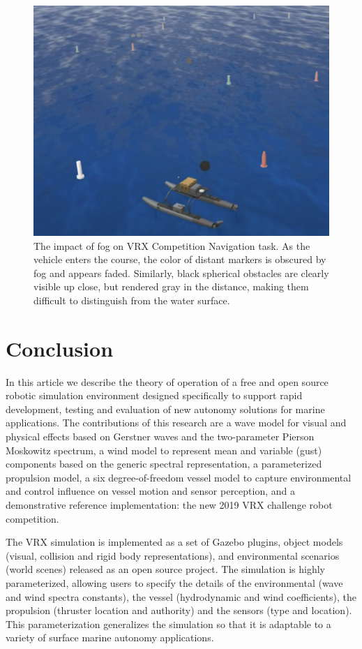 \documentclass[utf8]{frontiersSCNS} %
\begin{document}
\begin{figure}[hbt!]
  \centering
  \includegraphics[width=\FigWidth\textwidth]{images/navigation_wide_fog_2.png}
  \caption{The impact of fog on VRX Competition Navigation task. As the vehicle enters the course, the color of distant markers is obscured by fog and appears faded. Similarly, black spherical obstacles are clearly visible up close, but rendered gray in the distance, making them difficult to distinguish from the water surface. }
  \label{f:navigation_fog}
\end{figure}

\section{Conclusion}

In this article we describe the theory of operation of a free and open source robotic simulation environment designed specifically to support rapid development, testing and evaluation of new autonomy solutions for marine applications. The contributions of this research are a wave model for visual and physical effects based on Gerstner waves and the two-parameter Pierson Moskowitz spectrum, a wind model to represent mean and variable (gust) components based on the generic spectral representation, a parameterized propulsion model, a six degree-of-freedom vessel model to capture environmental and control influence on vessel motion and sensor perception, and a demonstrative reference implementation: the new 2019 VRX challenge robot competition.

The VRX simulation is implemented as a set of Gazebo plugins, object models (visual, collision and rigid body representations), and environmental scenarios (world scenes) released as an open source project. The simulation is highly parameterized, allowing users to specify the details of the environmental (wave and wind spectra constants), the vessel (hydrodynamic and wind coefficients), the propulsion (thruster location and authority) and the sensors (type and location). This parameterization generalizes the simulation so that it is adaptable to a variety of surface marine autonomy applications.
\end{document}

